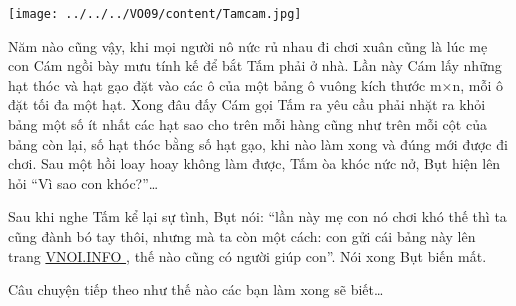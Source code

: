 \texttt{[image: ../../../VO09/content/Tamcam.jpg]}

       Năm nào cũng vậy, khi mọi người nô nức rủ nhau đi chơi xuân cũng là lúc mẹ con Cám ngồi bày mưu tính kế để bắt Tấm phải ở nhà. Lần này Cám lấy những hạt thóc và hạt gạo đặt vào các ô của một bảng ô vuông kích thước m×n, mỗi ô đặt tối đa một hạt. Xong đâu đấy Cám gọi Tấm ra yêu cầu phải nhặt ra khỏi bảng một số ít nhất các hạt sao cho trên mỗi hàng cũng như trên mỗi cột của bảng còn lại, số hạt thóc bằng số hạt gạo, khi nào làm xong và đúng mới được đi chơi. Sau một hồi loay hoay không làm được, Tấm òa khóc nức nở, Bụt hiện lên hỏi “Vì sao con khóc?”…      

       Sau khi nghe Tấm kể lại sự tình, Bụt nói: “lần này mẹ con nó chơi khó thế thì ta cũng đành bó tay thôi, nhưng mà ta còn một cách: con gửi cái bảng này lên trang       \href{http://vnoi.info/}{        VNOI.INFO       }       , thế nào cũng có người giúp con”. Nói xong Bụt biến mất.      

       Câu chuyện tiếp theo như thế nào các bạn làm xong sẽ biết…